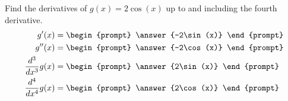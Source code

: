 \documentclass{ximera}
\author{Gregory Hartman \and Matthew Carr}
\begin{document}
\begin{exercise}




Find the derivatives of $g(x)=2\cos(x)$ up to and including the fourth derivative.
\begin{align*} 
g'(x)&=
\begin{prompt}
\answer{-2\sin(x)}
\end{prompt}\\
g''(x)&=
\begin{prompt} 
\answer{-2\cos(x)}
\end{prompt}\\
\frac{d^3}{dx^3}g(x)&=
\begin{prompt} 
\answer{2\sin(x)}
\end{prompt}\\
\frac{d^4}{dx^4}g(x) &=
\begin{prompt} 
\answer{2\cos(x)}
\end{prompt}
\end{align*}

\end{exercise}
\end{document}
